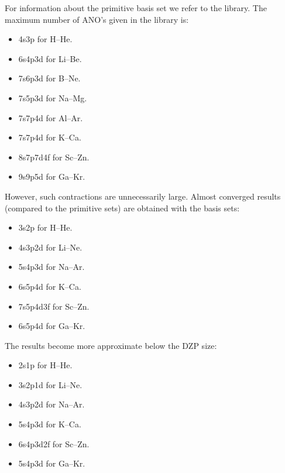 For information about the primitive basis set we refer to the library.
The maximum number of ANO's given in the library is:
\begin{itemize}
\item 4s3p for H--He.
\item 6s4p3d for Li--Be.
\item 7s6p3d for B--Ne.
\item 7s5p3d for Na--Mg.
\item 7s7p4d for Al--Ar.
\item 7s7p4d for K--Ca.
\item 8s7p7d4f for Sc--Zn.
\item 9s9p5d for Ga--Kr.
\end{itemize}
However, such contractions are unnecessarily large. Almost converged
results (compared to the primitive sets) are obtained with the basis
sets:
\begin{itemize}
\item 3s2p for H--He.
\item 4s3p2d for Li--Ne.
\item 5s4p3d for Na--Ar.
\item 6s5p4d for K--Ca.
\item 7s5p4d3f for Sc--Zn.
\item 6s5p4d for Ga--Kr.
\end{itemize}
The results become more approximate below the DZP size:
\begin{itemize}
\item 2s1p for H--He.
\item 3s2p1d for Li--Ne.
\item 4s3p2d for Na--Ar.
\item 5s4p3d for K--Ca.
\item 6s4p3d2f for Sc--Zn.
\item 5s4p3d for Ga--Kr.
\end{itemize}

